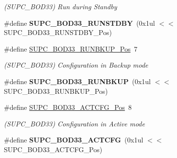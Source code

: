 \begin{DoxyCompactItemize}
\begin{DoxyCompactList}\small\item\em (S\+U\+P\+C\+\_\+\+B\+O\+D33) Run during Standby \end{DoxyCompactList}\item 
\hypertarget{group___s_a_m_l21___s_u_p_c_gaa399f45530f8144e9196784e3625de89}{}\#define {\bfseries S\+U\+P\+C\+\_\+\+B\+O\+D33\+\_\+\+R\+U\+N\+S\+T\+D\+B\+Y}~(0x1ul $<$$<$ S\+U\+P\+C\+\_\+\+B\+O\+D33\+\_\+\+R\+U\+N\+S\+T\+D\+B\+Y\+\_\+\+Pos)\label{group___s_a_m_l21___s_u_p_c_gaa399f45530f8144e9196784e3625de89}

\item 
\hypertarget{group___s_a_m_l21___s_u_p_c_ga53db2caae11323b5b339d18acc5c9148}{}\#define \hyperlink{group___s_a_m_l21___s_u_p_c_ga53db2caae11323b5b339d18acc5c9148}{S\+U\+P\+C\+\_\+\+B\+O\+D33\+\_\+\+R\+U\+N\+B\+K\+U\+P\+\_\+\+Pos}~7\label{group___s_a_m_l21___s_u_p_c_ga53db2caae11323b5b339d18acc5c9148}

\begin{DoxyCompactList}\small\item\em (S\+U\+P\+C\+\_\+\+B\+O\+D33) Configuration in Backup mode \end{DoxyCompactList}\item 
\hypertarget{group___s_a_m_l21___s_u_p_c_gabec58488eb085062b9cc57f56d3c1718}{}\#define {\bfseries S\+U\+P\+C\+\_\+\+B\+O\+D33\+\_\+\+R\+U\+N\+B\+K\+U\+P}~(0x1ul $<$$<$ S\+U\+P\+C\+\_\+\+B\+O\+D33\+\_\+\+R\+U\+N\+B\+K\+U\+P\+\_\+\+Pos)\label{group___s_a_m_l21___s_u_p_c_gabec58488eb085062b9cc57f56d3c1718}

\item 
\hypertarget{group___s_a_m_l21___s_u_p_c_ga4446ef3a635c432c43b1858f97074c18}{}\#define \hyperlink{group___s_a_m_l21___s_u_p_c_ga4446ef3a635c432c43b1858f97074c18}{S\+U\+P\+C\+\_\+\+B\+O\+D33\+\_\+\+A\+C\+T\+C\+F\+G\+\_\+\+Pos}~8\label{group___s_a_m_l21___s_u_p_c_ga4446ef3a635c432c43b1858f97074c18}

\begin{DoxyCompactList}\small\item\em (S\+U\+P\+C\+\_\+\+B\+O\+D33) Configuration in Active mode \end{DoxyCompactList}\item 
\hypertarget{group___s_a_m_l21___s_u_p_c_gab9ebf3ebb64ee7c801957e7739fdee8c}{}\#define {\bfseries S\+U\+P\+C\+\_\+\+B\+O\+D33\+\_\+\+A\+C\+T\+C\+F\+G}~(0x1ul $<$$<$ S\+U\+P\+C\+\_\+\+B\+O\+D33\+\_\+\+A\+C\+T\+C\+F\+G\+\_\+\+Pos)\label{group___s_a_m_l21___s_u_p_c_gab9ebf3ebb64ee7c801957e7739fdee8c}


\end{DoxyCompactItemize}

